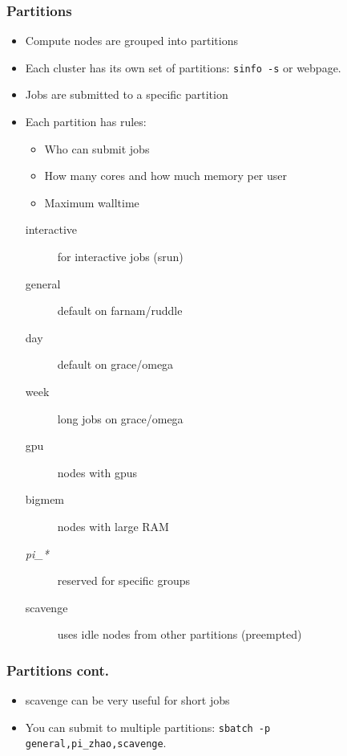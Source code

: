 \documentclass[10pt]{beamer}
\begin{document}
\begin{frame}[fragile]
\frametitle{Partitions}
\begin{itemize}
\item Compute nodes are grouped into partitions
\item Each cluster has its own set of partitions: \verb+sinfo -s+ or webpage.
\item Jobs are submitted to a specific partition
\item Each partition has rules:
\begin{itemize}
\item Who can submit jobs
\item How many cores and how much memory per user
\item Maximum walltime
\end{itemize}
\begin{description}
\item [interactive] for interactive jobs (srun)
\item [general] default on farnam/ruddle
\item [day] default on grace/omega
\item [week] long jobs on grace/omega
\item [gpu] nodes with gpus
\item [bigmem] nodes with large RAM
\item [\textit{pi\_*}] reserved for specific groups
\item [scavenge] uses idle nodes from other partitions (preempted)
\end{description}
\end{itemize}

\end{frame}

\begin{frame}[fragile]
\frametitle{Partitions cont.}
\begin{itemize}
\item scavenge can be very useful for short jobs
\item You can submit to multiple partitions:
\verb+sbatch -p general,pi_zhao,scavenge+.

\end{itemize}

\end{frame}
\end{document}
